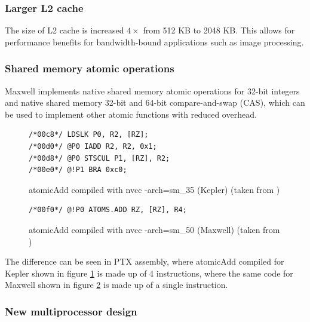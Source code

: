 \subsubsection{Larger L2 cache}

The size of L2 cache is increased $4 \times$ from 512 KB to 2048 KB. This allows for performance benefits for bandwidth-bound applications such as image processing.

\subsubsection{Shared memory atomic operations}\label{subsubsec:maxwell-shared-memory}

Maxwell implements native shared memory atomic operations for 32-bit integers and native shared memory 32-bit and 64-bit compare-and-swap (CAS), which can be used to implement other atomic functions with reduced overhead.

\begin{figure}
\begin{verbatim}
/*00c8*/ LDSLK P0, R2, [RZ];                          
/*00d0*/ @P0 IADD R2, R2, 0x1;                            
/*00d8*/ @P0 STSCUL P1, [RZ], R2;                         
/*00e0*/ @!P1 BRA 0xc0;                                   
\end{verbatim}
\caption{atomicAdd compiled with nvcc -arch=sm\_35 (Kepler) (taken from \cite{first-experience-maxwell})}
\label{code:atomic-add-kepler}
\end{figure}

\begin{figure}
\begin{verbatim}
/*00f0*/ @!P0 ATOMS.ADD RZ, [RZ], R4;                                 
\end{verbatim}
\caption{atomicAdd compiled with nvcc -arch=sm\_50 (Maxwell) (taken from \cite{first-experience-maxwell})} 
\label{code:atomic-add-maxwell}
\end{figure}

The difference can be seen in PTX assembly, where atomicAdd compiled for Kepler shown in figure \ref{code:atomic-add-kepler} is made up of 4 instructions, where the same code for Maxwell shown in figure \ref{code:atomic-add-maxwell} is made up of a single instruction.

\subsubsection{New multiprocessor design} \label{subsubsec:cuda-new-multip}

